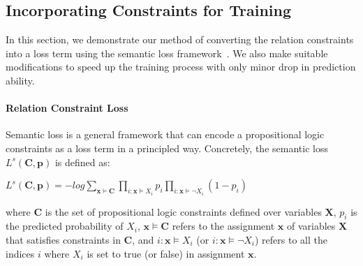 \subsection{Incorporating  Constraints for Training}
\label{sec:loss_term}
In this section, we demonstrate our method of converting the relation constraints into a loss term using the semantic loss framework~\cite{xu2017semantic}.
We also make suitable modifications to speed up the training process with only minor drop in prediction ability.

\paragraph{Relation Constraint Loss}
Semantic loss is a general framework that can encode a propositional logic constraints as a loss term in a principled way.
Concretely, the semantic loss $L^{s}(\textbf{C}, \textbf{p})$ is defined as:
\begin{center}
	$L^{s}(\textbf{C}, \textbf{p}) = -log\sum\limits_{\bm x\models\textbf{C}}\prod\limits_{i:\bm x\models X_i}p_i\prod\limits_{i:\bm x\models \neg X_i}(1-p_i)$
\end{center}
where $\textbf{C}$ is the set of propositional logic constraints defined over variables $\textbf{X}$,
$p_i$ is the predicted probability of $X_i$,
$\bm x \models \textbf{C}$ refers to the assignment $\bm x$ of variables $\bm X$ that satisfies constraints in $\textbf{C}$,
and $i:\bm x \models X_i$ (or $i:\bm x\models \neg X_i$) refers to all the indices $i$ where $X_i$ is set to true (or false) in assignment $\bm x$.


